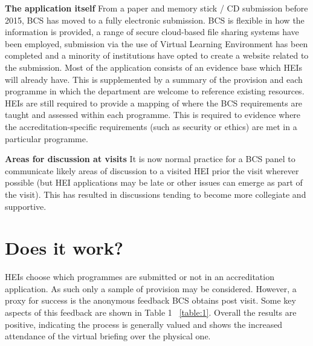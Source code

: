 \documentclass[sigconf]{acmart}
\begin{document}
{\textbf{The application itself}}
From a paper and memory stick / CD submission before 2015, BCS has moved to a fully electronic submission. BCS is flexible in how the information is provided, a range of secure cloud-based file sharing systems have been employed, submission via the use of Virtual Learning Environment has been completed and a minority of institutions have opted to create a website related to the submission. Most of the application consists of an evidence base which HEIs will already have. This is supplemented by a summary of the provision and each programme in which the department are welcome to reference existing resources. HEIs are still required to provide a mapping of where the BCS requirements are taught and assessed within each programme. This is required to evidence where the accreditation-specific requirements (such as security or ethics) are met in a particular programme.

{\textbf{Areas for discussion at visits}}
It is now normal practice for a BCS panel to communicate likely areas of discussion to a visited HEI prior the visit wherever  possible (but HEI applications may be late or other issues can emerge as part of the visit).   This has resulted in discussions tending to become more collegiate and supportive. 
\begin{comment}
\subsection{Promoting the value of accreditation}
The value proposition discussed in this document is a definition of the value of accreditation from those who are intimately involved. BCS is in the process of initiating a conversation to explore the value proposition of accreditation from the point of view of other stakeholders.
\end{comment}

\section {Does it work?}

HEIs choose which programmes are submitted or not in an accreditation application. As such only a sample of provision may be considered. However, a proxy for success is the anonymous feedback BCS obtains post visit. Some key aspects of this feedback are shown in Table 1 ~\ref{table:1}. Overall the results are positive, indicating the process is generally valued and shows the increased attendance of the virtual briefing over the physical one.
\end{document}
